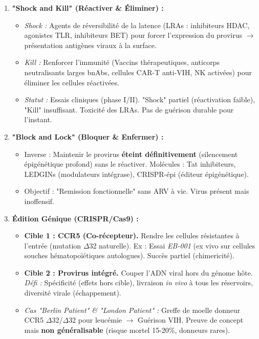 \documentclass[11pt]{article}
\begin{document}
\begin{savaistu}
\begin{enumerate}
\item \textbf{"Shock and Kill" (Réactiver \& Éliminer) :}
    \begin{itemize}
    \item \textit{Shock :} Agents de réversibilité de la latence (LRAs : inhibiteurs HDAC, agonistes TLR, inhibiteurs BET) pour forcer l'expression du provirus $\to$ présentation antigènes viraux à la surface.
    \item \textit{Kill :} Renforcer l'immunité (Vaccins thérapeutiques, anticorps neutralisants larges bnAbs, cellules CAR-T anti-VIH, NK activées) pour éliminer les cellules réactivées.
    \item \textit{Statut :} Essais cliniques (phase I/II). "Shock" partiel (réactivation faible), "Kill" insuffisant. Toxicité des LRAs. Pas de guérison durable pour l'instant.
    \end{itemize}
\item \textbf{"Block and Lock" (Bloquer \& Enfermer) :}
    \begin{itemize}
    \item Inverse : Maintenir le provirus \textbf{éteint définitivement} (silencement épigénétique profond) sans le réactiver. Molécules : Tat inhibiteurs, LEDGINs (modulateurs intégrase), CRISPR-épi (éditeur épigénétique).
    \item Objectif : "Remission fonctionnelle" sans ARV à vie. Virus présent mais inoffensif.
    \end{itemize}
\item \textbf{Édition Génique (CRISPR/Cas9) :}
    \begin{itemize}
    \item \textbf{Cible 1 : CCR5 (Co-récepteur).} Rendre les cellules résistantes à l'entrée (mutation $\Delta$32 naturelle). Ex : Essai \textit{EB-001} (ex vivo sur cellules souches hématopoïétiques autologues). Succès partiel (chimericité).
    \item \textbf{Cible 2 : Provirus intégré.} Couper l'ADN viral hors du génome hôte. \textit{Défi :} Spécificité (effets hors cible), livraison \textit{in vivo} à tous les réservoirs, diversité virale (échappement).
    \item \textit{Cas "Berlin Patient" \& "London Patient" :} Greffe de moelle donneur CCR5 $\Delta$32/$\Delta$32 pour leucémie $\to$ Guérison VIH. Preuve de concept mais \textbf{non généralisable} (risque mortel 15-20\%, donneurs rares).

\end{itemize}
\end{enumerate}
\end{savaistu}
\end{document}
